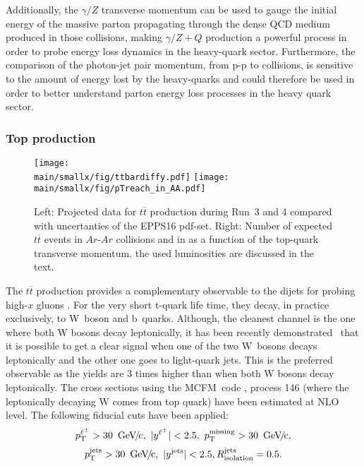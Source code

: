 \documentclass[../report.tex]{subfiles}
\providecommand{\main}{..}
\begin{document}
Additionally, the $\gamma/Z$ transverse momentum can be used to gauge the
initial energy of the massive parton propagating through the dense QCD
medium produced in those collisions, making $\gamma/Z+ Q$ production a
powerful process in order to probe energy loss dynamics in the
heavy-quark sector.  
%
Furthermore, the comparison of the photon-jet pair momentum, from p-p
to \PbPb collisions, is sensitive to the amount of energy lost by the
heavy-quarks and could therefore be used in order to better understand
parton energy loss processes in the heavy quark sector.



\subsubsection{Top production}
\label{sec:nPDF_top}

\begin{figure}[htb!]
\centering
\texttt{[image: \\main/smallx/fig/ttbardiffy.pdf]}
\texttt{[image: \\main/smallx/fig/pTreach\_in\_AA.pdf]}
\caption{Left: Projected data for $t\overline{t}$ production during Run~3 and 4 compared with uncertanties of the EPPS16  pdf-set. Right: Number of expected $t\overline{t}$ events in $Ar$-$Ar$ collisions and in \PbPb as a function of the top-quark transverse momentum. the used luminosities are discussed in the text.}
\label{fig:ttbardiffy}
\end{figure}

The $t\overline{t}$ production provides a complementary observable to the dijets for probing high-$x$ gluons \cite{dEnterria:2015mgr,Sirunyan:2017xku}. For the very short t-quark life time, they decay, in practice exclusively, to W~boson and b~quarks. Although, the cleanest channel is the one where both W bosons decay leptonically, it has been recently demonstrated~\cite{Sirunyan:2017xku} that it is possible to get a clear signal when one of the two W~bosons decays leptonically and the other one goes to light-quark jets. This is the preferred observable as the yields are 3 times higher than when both W bosons decay leptonically. The cross sections using the MCFM~code \cite{Campbell:2015qma}, process 146 (where the leptonically decaying W comes from top quark) have been estimated at NLO level. The following fiducial cuts have been applied:
$$ \pT^{\ell^\pm} > 30 \, {\rm \UGeVc}, \ |y^{\ell^\pm}| < 2.5, \ \pT^{\rm missing} > 30 \, {\rm \UGeVc}, $$
$$ p\sb{\scriptstyle\mathrm{T}}^{\rm jets} > 30 \, {\rm ~\text{GeV}\!/\mspace{-2mu}c}, \ |y^{\rm jets}| < 2.5, R_{\rm isolation}^{\rm jets} = 0.5. $$
\end{document}
